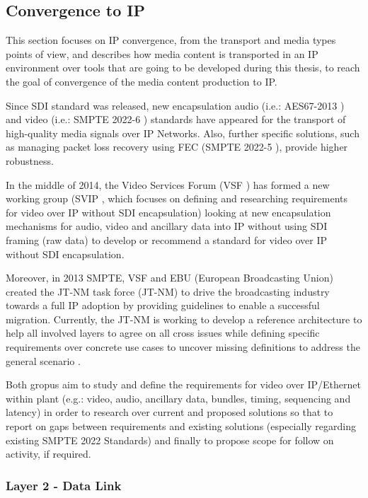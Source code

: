 \subsection{Convergence to IP}

This section focuses on IP convergence, from the transport and media types points of view, and describes how media content is transported in an IP environment over tools that are going to be developed during this thesis, to reach the goal of convergence of the media content production to IP. 

Since SDI standard was released, new encapsulation audio (i.e.: AES67-2013 \cite{AES}) and video (i.e.: SMPTE 2022-6 \cite{ST2022}) standards have appeared for the transport of high-quality media signals over IP Networks. Also, further specific solutions, such as managing packet loss recovery using FEC (SMPTE 2022-5 \cite{ST20225}), provide higher robustness.

In the middle of 2014, the Video Services Forum (VSF \cite{VSF}) has formed a new working group (SVIP \cite{SVIP}, which focuses on defining and researching requirements for video over IP without SDI encapsulation) looking at new encapsulation mechanisms for audio, video and ancillary data into IP without using SDI framing (raw data) to develop or recommend a standard for video over IP without SDI encapsulation.

Moreover, in 2013 SMPTE, VSF and EBU (European Broadcasting Union) created the JT-NM task force (JT-NM) to drive the broadcasting industry towards a full IP adoption by providing guidelines to enable a successful migration. Currently, the JT-NM is working to develop a reference architecture to help all involved layers to agree on all cross issues while defining specific requirements over concrete use cases to uncover missing definitions to address the general scenario \cite{jtnm}.

Both gropus aim to study and define the requirements for video over IP/Ethernet within plant (e.g.: video, audio, ancillary data, bundles, timing, sequencing and latency) in order to research over current and proposed solutions so that to report on gaps between requirements and existing solutions (especially regarding existing SMPTE 2022 Standards) and finally to propose scope for follow on activity, if required.

\subsubsection{Layer 2 - Data Link}

